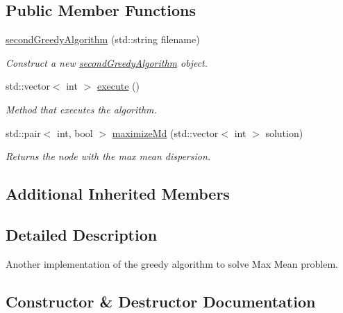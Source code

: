 \subsection*{Public Member Functions}
\begin{DoxyCompactItemize}
\item 
\hyperlink{classsecondGreedyAlgorithm_a0514ddce71b6343aaf54833c687a0fdf}{second\+Greedy\+Algorithm} (std\+::string filename)
\begin{DoxyCompactList}\small\item\em Construct a new \hyperlink{classsecondGreedyAlgorithm}{second\+Greedy\+Algorithm} object. \end{DoxyCompactList}\item 
std\+::vector$<$ int $>$ \hyperlink{classsecondGreedyAlgorithm_a119a730116003d00438179ccf4e2cafd}{execute} ()
\begin{DoxyCompactList}\small\item\em Method that executes the algorithm. \end{DoxyCompactList}\item 
std\+::pair$<$ int, bool $>$ \hyperlink{classsecondGreedyAlgorithm_a1935f11c28b41515f6953f8108fbf482}{maximize\+Md} (std\+::vector$<$ int $>$ solution)
\begin{DoxyCompactList}\small\item\em Returns the node with the max mean dispersion. \end{DoxyCompactList}\end{DoxyCompactItemize}
\subsection*{Additional Inherited Members}


\subsection{Detailed Description}
Another implementation of the greedy algorithm to solve Max Mean problem. 

\subsection{Constructor \& Destructor Documentation}
\mbox{\label{classsecondGreedyAlgorithm_a0514ddce71b6343aaf54833c687a0fdf}} 
